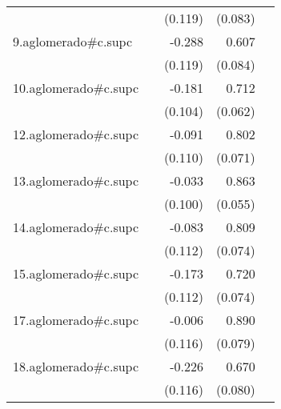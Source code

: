 {\begin{longtable}{l*{4}{D{.}{.}{-1}}}
            &                     &     (0.119)         &     (0.083)         &                     \\
\addlinespace
9.aglomerado#c.supc&                     &      -0.288\sym{*}  &       0.607\sym{***}&                     \\
            &                     &     (0.119)         &     (0.084)         &                     \\
\addlinespace
10.aglomerado#c.supc&                     &      -0.181         &       0.712\sym{***}&                     \\
            &                     &     (0.104)         &     (0.062)         &                     \\
\addlinespace
12.aglomerado#c.supc&                     &      -0.091         &       0.802\sym{***}&                     \\
            &                     &     (0.110)         &     (0.071)         &                     \\
\addlinespace
13.aglomerado#c.supc&                     &      -0.033         &       0.863\sym{***}&                     \\
            &                     &     (0.100)         &     (0.055)         &                     \\
\addlinespace
14.aglomerado#c.supc&                     &      -0.083         &       0.809\sym{***}&                     \\
            &                     &     (0.112)         &     (0.074)         &                     \\
\addlinespace
15.aglomerado#c.supc&                     &      -0.173         &       0.720\sym{***}&                     \\
            &                     &     (0.112)         &     (0.074)         &                     \\
\addlinespace
17.aglomerado#c.supc&                     &      -0.006         &       0.890\sym{***}&                     \\
            &                     &     (0.116)         &     (0.079)         &                     \\
\addlinespace
18.aglomerado#c.supc&                     &      -0.226         &       0.670\sym{***}&                     \\
            &                     &     (0.116)         &     (0.080)         &                     \\

\end{longtable}}
